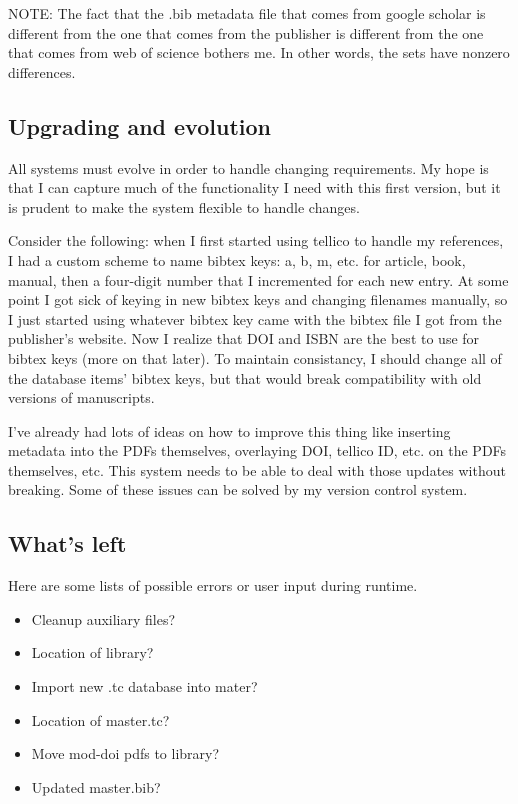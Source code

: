 \documentclass[letterpaper,12pt]{article}
\begin{document}
NOTE: The fact that the .bib metadata file that comes from google scholar is different from the one that comes from the publisher is different from the one that comes from web of science bothers me. In other words, the sets have nonzero differences.



\subsection{Upgrading and evolution}
All systems must evolve in order to handle changing requirements. My hope is that I can capture much of the functionality I need with this first version, but it is prudent to make the system flexible to handle changes.

Consider the following: when I first started using tellico to handle my references, I had a custom scheme to name bibtex keys: a, b, m, etc. for article, book, manual, then a four-digit number that I incremented for each new entry. At some point I got sick of keying in new bibtex keys and changing filenames manually, so I just started using whatever bibtex key came with the bibtex file I got from the publisher's website. Now I realize that DOI and ISBN are the best to use for bibtex keys (more on that later). To maintain consistancy, I should change all of the database items' bibtex keys, but that would break compatibility with old versions of manuscripts.

I've already had lots of ideas on how to improve this thing like inserting metadata into the PDFs themselves, overlaying DOI, tellico ID, etc. on the PDFs themselves, etc. This system needs to be able to deal with those updates without breaking. Some of these issues can be solved by my version control system.





\subsection{What's left}
Here are some lists of possible errors or user input during runtime.

\begin{itemize}
\item Cleanup auxiliary files?
\item Location of library?
\item Import new .tc database into mater?
\item Location of master.tc?
\item Move mod-doi pdfs to library?
\item Updated master.bib?
\end{itemize}
\end{document}

